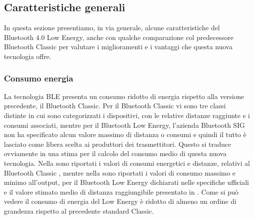  \subsection{Caratteristiche generali}
 
In questa sezione presentiamo, in via generale, alcune caratteristiche del Bluetooth 4.0 Low Energy, anche con qualche comparazione col predecessore Bluetooth Classic per valutare i miglioramenti e i vantaggi che questa nuova tecnologia offre.


\subsubsection{Consumo energia}
La tecnologia \acf{BLE} presenta un consumo ridotto di energia rispetto alla versione precedente, il Bluetooth Classic. Per il Bluetooth Classic vi sono tre classi distinte in cui sono categorizzati i dispositivi, con le relative distanze raggiunte e i consumi associati, mentre per il Bluetooth Low Energy, l’azienda Bluetooth SIG non ha specificato alcun valore massimo di distanza o consumi e quindi il tutto è lasciato come libera scelta ai produttori dei trasmettitori. Questo si traduce ovviamente in una stima per il calcolo del consumo medio di questa nuova tecnologia. Nella  sono riportati i valori di consumi energetici e distanze, relativi al Bluetooth Classic \cite{BT-Basics}, mentre nella  sono riportati i valori di consumo massimo e minimo all'output, per il Bluetooth Low Energy dichiarati nelle specifiche ufficiali \cite{BT-CoreSpec4.0} e il valore stimato medio di distanza raggiungibile presentato in \cite{tesi_tibertoa2013}. Come si può vedere il consumo di energia del Low Energy è ridotto di almeno un ordine di grandezza rispetto al precedente standard Classic.


